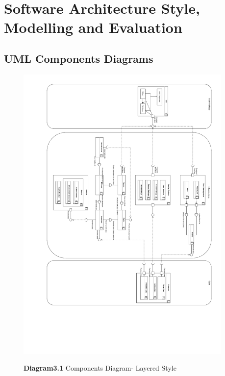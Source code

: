 \documentclass[a4paper]{article}
\begin{document}
	\section{Software Architecture Style, Modelling and Evaluation}

	\subsection{UML Components Diagrams}

	\begin{figure}[H]
		\centering
		\caption*{\textbf{Diagram3.1} Components Diagram- Layered Style}
		\includegraphics[width=0.95\textwidth]{images/ComponentsDiagram_Layered.pdf}
		\label{CD_L}
	\end{figure}
\end{document}
